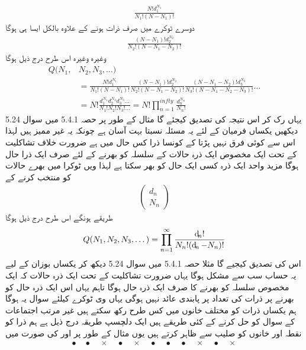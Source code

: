 \begin{align*}
\frac{N ! d_1^{N_1}}{N_1 ! (N - N_1) !}
\end{align*}
دوسرے ٹوکرے میں صرف  ذرات ہونے کے علاوہ بالکل ایسا ہی ہوگا 
\begin{align*}
\frac{(N - N_1) ! d_2^{N_2}}{N_2 ! (N - N_1 - N_2) !}
\end{align*}
وغیرہ وغیرہ اس طرح درج ذیل ہوگا 
\begin{align}
Q (N_1 , &N_2 , N_3 , \dotsc) \\
&= \frac{N ! d_1^{N_1}}{N_1 ! (N - N_1) !} \frac{(N - N_1) ! d_2^{N_2}}{N_2 ! (N - N_1 - N_2) !} \frac{(N - N_1 - N_2) ! d_3^{N_3}}{N_3 ! (N - N_1 - N_2 - N_3) !} \dotsc\\
&= N ! \frac{d_1^{N_1} d_2^{N_2} d_3^{N_3} \dotsc}{N_1 ! N_2 ! N_3 ! \dotsc} = N! \prod_{n = 1}^{infty} \frac{d_n^{N_n}}{N_n !}
\end{align}
یہاں رک کر اس نتیجہ کی تصدیق کیجئے گا مثال کے طور پر حصہ 5.4.1 میں سوال 5.24 دیکھیں یکساں فرمیان کے لئے یہ مسئلہ نسبتا بہت آسان ہے چونکہ یہ غیر ممیز ہیں لہذا اس سے کوئی فرق نہیں پڑتا کے کونسا ذرا کس حال میں ہے ضرورت خلاف تشاکلیت کے تحت ایک مخصوص ایک ذرہ حالات کے سلسلہ کو بھرنے کے لئے صرف ایک  ذرا حال ہوگا مزید واحد ایک ذرہ کسی ایک حال کو بھر سکتا ہے لہذا  ویں ٹوکرا میں  بهرے  حالات کو منتخب کرنے کے 
\begin{align*}
\begin{pmatrix}
d_n \\
N_n
\end{pmatrix}
\end{align*}
طریقے ہونگے اس طرح درج ذیل ہوگا 
\begin{align}
Q (N_1 , N_2 , N_3 , \dotsc ) = \prod_{n = 1}^{\infty} \frac{\dif_n !}{N_n ! (\dif_n - N_n) !}
\end{align}
اس کی تصدیق کیجیے گا مثلا حصہ 5.4.1 میں سوال 5.24 دیکھ کر یکساں بوزان کے لیے یہ حساب سب سے مشکل ہوگا یہاں ضرورت تشاکلیت کے تحت ایک ذرہ حالات کہ ایک مخصوص سلسلہ کو بھرنے کا صرف ایک  ذرہ حال ہوگا تاہم یہاں اس ایک ذرہ حال کو بھرنے پر ذرات کی تعداد پر پابندی عائد نہیں ہوگی یہاں  وی ٹوکرے کیلئے سوال یہ ہوگا ہم یکساں  ذرات کو  مختلف خانوں میں کس طرح رکھ سکتے ہیں غیر مرتب اجتماعات کے سوال کو حل کرنے کے کئی طریقے ہیں ایک دلچسپ طریقہ درج ذیل ہے ہم ذرا کو نقطہ اور خانوں کو صلیب سے ظاہر کرتے ہیں یوں مثال کے طور پر  اور  کی صورت میں
\begin{align*} 
\bullet \quad \bullet \quad \times \quad \bullet \quad \times \quad \bullet \quad \bullet \quad \bullet \quad \times \quad \bullet \quad \times
\end{align*}
